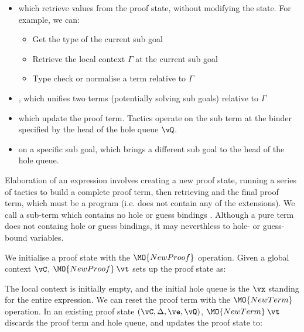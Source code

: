 \begin{itemize}
\item {} which retrieve values from the proof state, without modifying
the state. For example, we can:
\begin{itemize}
\item Get the type of the current sub goal
\item Retrieve the local context $\Gamma$ at the current sub goal
\item Type check or normalise a term relative to $\Gamma$
\end{itemize}
\item {}, which unifies two terms (potentially solving sub goals) 
relative to $\Gamma$
\item {} which update the proof term. Tactics operate on the sub term
at the binder specified by the head of the hole queue $\vQ$.
\item {} on a specific sub goal, which brings a different sub goal to the
head of the hole queue.
\end{itemize}

Elaboration of an \Idris{} expression involves creating a new proof state, running
a series of tactics to build a complete proof term, then retrieving and 
the final proof term, which must be a \TT{} program (i.e. does not contain any of the
\TTdev{} extensions). We call a sub-term which contains no hole or guess bindings 
. Although a pure term does not containg hole or guess bindings, it may
neverthless  to hole- or guess-bound variables.

We initialise a proof state with the $\MO{NewProof}$ operation. Given a global
context $\vC$, $\MO{NewProof}\:\vt$ sets up the proof state as:

\DM{
(\vC, \cdot, \hole{\vx}{\vt}\SC\vx, \langle\vx\rangle)
}

The local context is initially empty, and the initial hole queue is the $\vx$ standing for
the entire expression. We can reset the proof term with the $\MO{NewTerm}$ operation.
In an existing proof state $(\vC, \Delta, \ve, \vQ)$,
$\MO{NewTerm}\:\vt$ discards the proof term and hole queue, and
updates the proof state to:

\DM{
(\vC, \Delta, \hole{\vx}{\vt}\SC\vx, \langle\vx\rangle)
}


